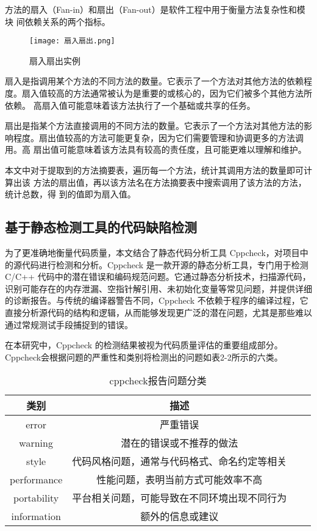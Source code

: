 方法的扇入（Fan-in）和扇出（Fan-out）是软件工程中用于衡量方法复杂性和模块
间依赖关系的两个指标。

\begin{figure}[h]
\centering
\texttt{[image: 扇入扇出.png]}
\caption{扇入扇出实例}
\end{figure}
    

扇入是指调用某个方法的不同方法的数量。它表示了一个方法对其他方法的依赖程
度。扇入值较高的方法通常被认为是重要的或核心的，因为它们被多个其他方法所依赖。
高扇入值可能意味着该方法执行了一个基础或共享的任务。


扇出是指某个方法直接调用的不同方法的数量。它表示了一个方法对其他方法的影
响程度。扇出值较高的方法可能更复杂，因为它们需要管理和协调更多的方法调用。高
扇出值可能意味着该方法具有较高的责任度，且可能更难以理解和维护。


本文中对于提取到的方法摘要表，遍历每一个方法，统计其调用方法的数量即可计算出该
方法的扇出值，再以该方法名在方法摘要表中搜索调用了该方法的方法，统计总数，得
到的值即为扇入值。

\subsection{基于静态检测工具的代码缺陷检测}

为了更准确地衡量代码质量，本文结合了静态代码分析工具 Cppcheck，对项目中的源代码进行检测和分析。Cppcheck 是一款开源的静态分析工具，专门用于检测 C/C++ 代码中的潜在错误和编码规范问题。它通过静态分析技术，扫描源代码，识别可能存在的内存泄漏、空指针解引用、未初始化变量等常见问题，并提供详细的诊断报告。与传统的编译器警告不同，Cppcheck 不依赖于程序的编译过程，它直接分析源代码的结构和逻辑，从而能够发现更广泛的潜在问题，尤其是那些难以通过常规测试手段捕捉到的错误。

在本研究中，Cppcheck 的检测结果被视为代码质量评估的重要组成部分。Cppcheck会根据问题的严重性和类别将检测出的问题如表2-2所示的六类。

\begin{table}[htbp]
\caption{cppcheck报告问题分类}
\vspace{0.5em}\centering\wuhao
\begin{tabular}{cccc}
\toprule
类别 & 描述 \\
\midrule
error &  严重错误 \\
warning & 潜在的错误或不推荐的做法 \\
style & 代码风格问题，通常与代码格式、命名约定等相关 \\
performance & 性能问题，表明当前方式可能效率不高 \\ 
portability & 平台相关问题，可能导致在不同环境出现不同行为 \\
information & 额外的信息或建议 \\ 
\bottomrule
\end{tabular}
\end{table}

